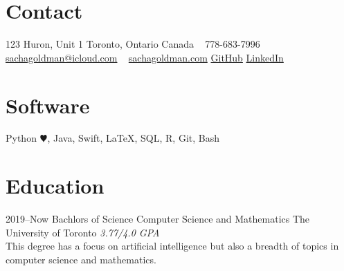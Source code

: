 \documentclass[]{style}
\begin{document}


\begin{aside} %
\section{Contact}
123 Huron, Unit 1
Toronto, Ontario
Canada
~
778-683-7996
\href{mailto:sachagoldman@icloud.com}{sachagoldman@icloud.com}
~
\href{https://sachagoldman.com}{sachagoldman.com}
\href{https://github.com/SachaGoldman}{GitHub}
\href{https://linkedin.com/in/sacha-goldman-5b95391a0/}{LinkedIn}
\section{Software}
Python {\color{red} $\varheartsuit$}, Java,
Swift, \LaTeX, SQL, 
R, Git, Bash
\end{aside}


\section{Education}

\begin{entrylist}


\entry
{2019–Now}
{Bachlors of Science {\normalfont Computer Science and Mathematics}}
{The University of Toronto}
{\emph{3.77/4.0 GPA} \\ This degree has a focus on artificial intelligence but also a breadth of topics in computer science and mathematics.}


\end{entrylist}

\end{document}
